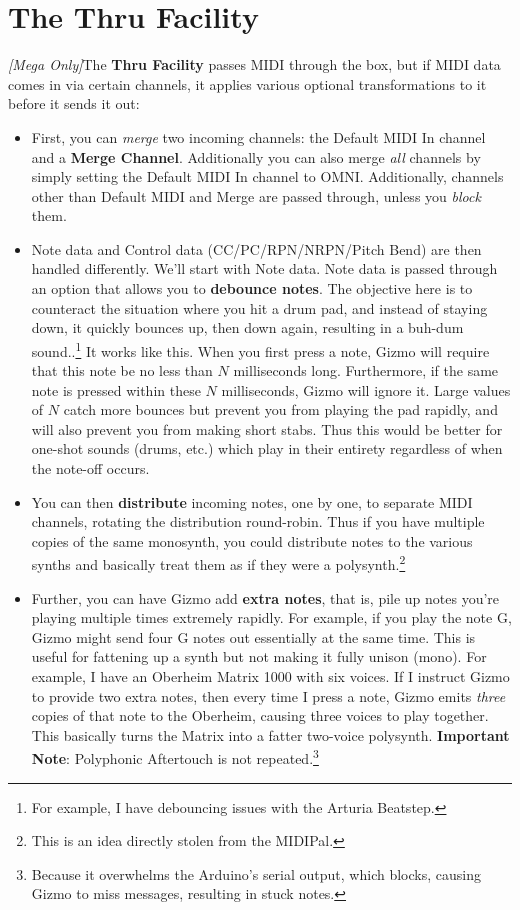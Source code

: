 \documentclass{article}
\begin{document}
\section{The Thru Facility}
\label{thru}

\textit{[Mega Only]}\qquad The {\bf Thru Facility} passes MIDI through the box, but if MIDI data comes in via certain channels, it applies various optional transformations to it before it sends it out:

\begin{itemize}
\item First, you can {\it merge} two incoming channels: the Default MIDI In channel and a {\bf Merge Channel}.  Additionally you can also merge {\it all} channels by simply setting the Default MIDI In channel to OMNI.  Additionally, channels other than Default MIDI and Merge are passed through, unless you {\it block} them.

\item Note data and Control data (CC/PC/RPN/NRPN/Pitch Bend) are then handled differently. We'll start with Note data.   Note data is passed through an option that allows you to {\bf debounce notes}.   The objective here is to counteract the situation where you hit a drum pad, and instead of staying down, it quickly bounces up, then down again, resulting in a buh-dum sound..\footnote{For example, I have debouncing issues with the Arturia Beatstep.}  It works like this.  When you first press a note, Gizmo will require that this note be no less than \(N\) milliseconds long.  Furthermore, if the same note is pressed within these \(N\) milliseconds, Gizmo will ignore it.     Large values of \(N\) catch more bounces but prevent you from playing the pad rapidly, and will also prevent you from making short stabs.  Thus this would be better for one-shot sounds (drums, etc.) which play in their entirety regardless of when the note-off occurs.

\item You can then {\bf distribute} incoming notes, one by one, to separate MIDI channels, rotating the distribution round-robin.  Thus if you have multiple copies of the same monosynth, you could distribute notes to the various synths and basically treat them as if they were a polysynth.\footnote{This is an idea directly stolen from the MIDIPal.}

\item Further, you can have Gizmo add {\bf extra notes}, that is, pile up notes you're playing multiple times extremely rapidly.  For example, if you play the note G, Gizmo might send four G notes out essentially at the same time.  This is useful for fattening up a synth but not making it fully unison (mono).  For example, I have an Oberheim Matrix 1000 with six voices.  If I instruct Gizmo to provide two extra notes, then every time I press a note, Gizmo emits {\it three} copies of that note to the Oberheim, causing three voices to play together.  This basically turns the Matrix into a fatter two-voice polysynth.  {\bf Important Note}: Polyphonic Aftertouch is not repeated.\footnote{\label{serialbuffer}Because it overwhelms the Arduino's serial output, which blocks, causing Gizmo to miss messages, resulting in stuck notes.}


\end{itemize}
\end{document}
